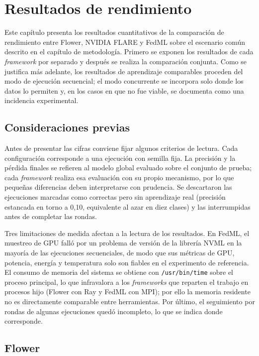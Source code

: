\chapter{Resultados de rendimiento}\label{chap:resultados-rendimiento}

Este capítulo presenta los resultados cuantitativos de la comparación de rendimiento entre
Flower, NVIDIA FLARE y FedML sobre el escenario común descrito en el capítulo de metodología.
Primero se exponen los resultados de cada \textit{framework} por separado y después se realiza
la comparación conjunta. Como se justifica más adelante, los resultados de aprendizaje
comparables proceden del modo de ejecución secuencial; el modo concurrente se incorpora solo
donde los datos lo permiten y, en los casos en que no fue viable, se documenta como una
incidencia experimental.

\section{Consideraciones previas}\label{sec:consideraciones-resultados}

Antes de presentar las cifras conviene fijar algunos criterios de lectura. Cada configuración
corresponde a una ejecución con semilla fija. La precisión y la pérdida finales se refieren al
modelo global evaluado sobre el conjunto de prueba; cada \textit{framework} realiza esa
evaluación con su propio mecanismo, por lo que pequeñas diferencias deben interpretarse con
prudencia. Se descartaron las ejecuciones marcadas como correctas pero sin aprendizaje real
(precisión estancada en torno a 0{,}10, equivalente al azar en diez clases) y las interrumpidas
antes de completar las rondas.

Tres limitaciones de medida afectan a la lectura de los resultados. En FedML, el muestreo de GPU
falló por un problema de versión de la librería NVML en la mayoría de las ejecuciones
secuenciales, de modo que sus métricas de GPU, potencia, energía y temperatura solo son fiables
en el experimento de referencia. El consumo de memoria del sistema se obtiene con
\texttt{/usr/bin/time} sobre el proceso principal, lo que infravalora a los \textit{frameworks}
que reparten el trabajo en procesos hijo (Flower con Ray y FedML con MPI); por ello la memoria
residente no es directamente comparable entre herramientas. Por último, el seguimiento por
rondas de algunas ejecuciones quedó incompleto, lo que se indica donde corresponde.

\section{Flower}\label{sec:resultados-flower}

